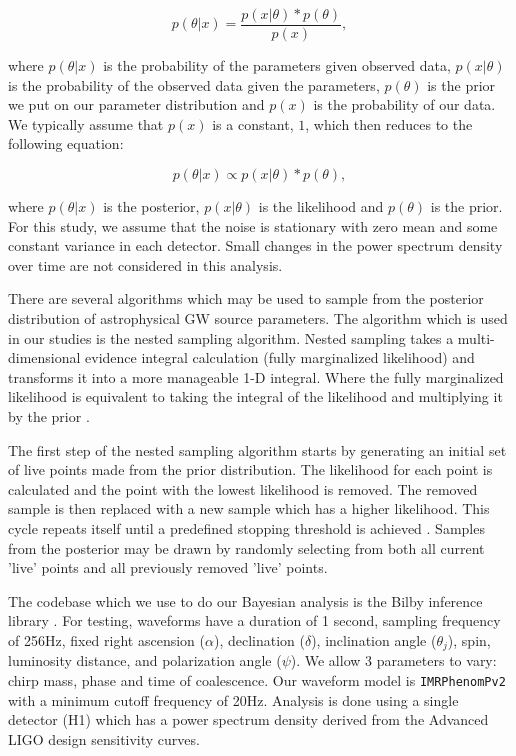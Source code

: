 \documentclass{nature}
\begin{document}
\begin{equation}
    p(\theta|x) = \frac{p(x|\theta) * p(\theta)}{p(x)},
\end{equation}

where $p(\theta|x)$ is the probability of the parameters given observed data, 
$p(x|\theta)$ is the probability of the observed data given the parameters, $p(\theta)$ 
is the prior we put on our parameter distribution and $p(x)$ is the probability of our data. 
We typically assume that $p(x)$ is a constant, $1$, which then reduces to the following equation:

\begin{equation}
    p(\theta|x) \propto p(x|\theta) * p(\theta),
\end{equation}

where $p(\theta|x)$ is the posterior, $p(x|\theta)$ is the likelihood and $p(\theta)$ is the prior. 
For this study, we assume that the noise is stationary with zero mean and some constant variance 
in each detector. Small changes in the power spectrum density over time are not considered in this analysis. 

%
%
There are several algorithms which may be used to sample from the posterior distribution 
of astrophysical GW source parameters. The algorithm which is used in our studies is 
the nested sampling algorithm. Nested sampling takes a multi-dimensional evidence 
integral calculation (fully marginalized likelihood) and transforms it into a more 
manageable 1-D integral. Where the fully marginalized likelihood is equivalent to taking 
the integral of the likelihood and multiplying it by the prior \cite{1409.7215}.

The first step of the nested sampling algorithm starts by generating an initial 
set of live points made from the prior distribution. The likelihood for each point 
is calculated and the point with the lowest likelihood is removed. The removed sample 
is then replaced with a new sample which has a higher likelihood. This cycle repeats 
itself until a predefined stopping threshold is achieved \cite{1409.7215}. Samples 
from the posterior may be drawn by randomly selecting from both all current 'live' 
points and all previously removed 'live' points. 

%
%
The codebase which we use to do our Bayesian analysis is the Bilby inference library 
\cite{1811.02042}. For testing, waveforms have a duration of 1 second, sampling frequency 
of 256Hz, fixed right ascension ($\alpha$), declination ($\delta$), inclination angle 
($\theta_j$), spin, luminosity distance, and polarization angle ($\psi$). We allow 3 
parameters to vary: chirp mass, phase and time of coalescence. Our waveform model is 
\texttt{IMRPhenomPv2} with a minimum cutoff frequency of 20Hz. Analysis is done using 
a single detector (H1) which has a power spectrum density derived from the Advanced 
LIGO design sensitivity curves.
\end{document}
